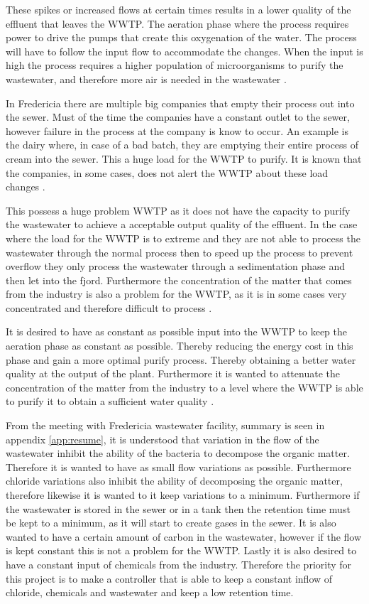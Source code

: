 These spikes or increased flows at certain times results in a lower quality of the effluent that leaves the WWTP. The aeration phase where the process requires power to drive the pumps that create this oxygenation of the water. The process will have to follow the input flow to accommodate the changes. When the input is high the process requires a higher population of microorganisms to purify the wastewater, and therefore more air is needed in the wastewater \cite{fredericia_spildevand_mode}. 

In Fredericia there are multiple big companies that empty their process out into the sewer. Must of the time the companies have a constant outlet to the sewer, however failure in the process at the company is know to occur. An example is the dairy where, in case of a bad batch, they are emptying their entire process of cream into the sewer. This a huge load for the WWTP to purify. It is known that the companies, in some cases, does not alert the WWTP about these load changes \cite{fredericia_spildevand_mode}. 

This possess a huge problem WWTP as it does not have the capacity to purify the wastewater to achieve a acceptable output quality of the effluent. In the case where the load for the WWTP is to extreme and they are not able to process the wastewater through the normal process then to speed up the process to prevent overflow they only process the wastewater through a sedimentation phase and then let into the fjord. Furthermore the concentration of the matter that comes from the industry is also a problem for the WWTP, as it is in some cases very concentrated and therefore difficult to process \cite{fredericia_spildevand_mode}.  

It is desired to have as constant as possible input into the WWTP to keep the aeration phase as constant as possible. Thereby reducing the energy cost in this phase and gain a more optimal purify process. Thereby obtaining a better water quality at the output of the plant. Furthermore it is wanted to attenuate the concentration of the matter from the industry to a level where the WWTP is able to purify it to obtain a sufficient water quality \cite{fredericia_spildevand_mode}. 

From the meeting with Fredericia wastewater facility, summary is seen in appendix \ref{app:resume}, it is understood that variation in the flow of the wastewater inhibit the ability of the bacteria to decompose the organic matter. Therefore it is wanted to have as small flow variations as possible. Furthermore chloride variations also inhibit the ability of decomposing the organic matter, therefore likewise it is wanted to it keep variations to a minimum. Furthermore if the wastewater is stored in the sewer or in a tank then the retention time must be kept to a minimum, as it will start to create gases in the sewer. It is also wanted to have a certain amount of carbon in the wastewater, however if the flow is kept constant this is not a problem for the WWTP. Lastly it is also desired to have a constant input of chemicals from the industry. Therefore the priority for this project is to make a controller that is able to keep a constant inflow of chloride, chemicals and wastewater and keep a low retention time.    

